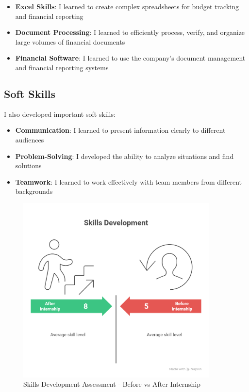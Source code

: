 \begin{itemize}[leftmargin=*, itemsep=0.25em]
    \item \textbf{Excel Skills}: I learned to create complex spreadsheets for budget tracking and financial reporting
    \item \textbf{Document Processing}: I learned to efficiently process, verify, and organize large volumes of financial documents
    \item \textbf{Financial Software}: I learned to use the company's document management and financial reporting systems
\end{itemize}

\subsection{Soft Skills}
I also developed important soft skills:

\begin{itemize}[leftmargin=*, itemsep=0.25em]
    \item \textbf{Communication}: I learned to present information clearly to different audiences
    \item \textbf{Problem-Solving}: I developed the ability to analyze situations and find solutions
    \item \textbf{Teamwork}: I learned to work effectively with team members from different backgrounds
\end{itemize}

\begin{figure}[H]
    \centering
    \includegraphics[width=0.9\textwidth]{assets/images/skills_radar_chart.png}
    \caption{Skills Development Assessment - Before vs After Internship}
    \label{fig:skills_radar_chart}
\end{figure}

